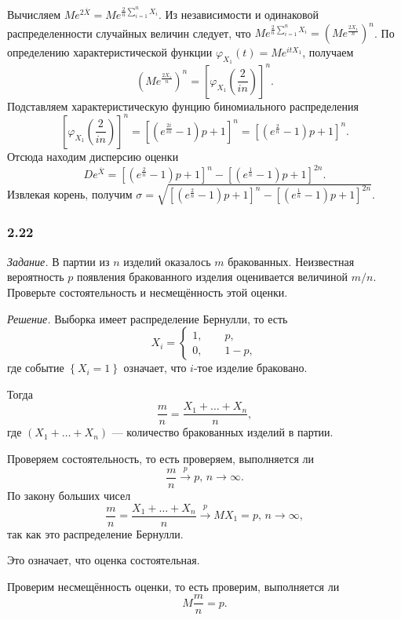 Вычисляем $Me^{2 \overline{X}} = Me^{ \frac{2}{n} \sum \limits_{i = 1}^n X_i}$.
Из независимости и одинаковой распределенности случайных величин следует,
что $Me^{ \frac{2}{n} \sum \limits_{i = 1}^n X_i} = \left( Me^{ \frac{2X_1}{n}} \right)^n$.
По определению характеристической функции $ \varphi_{X_1} \left( t \right) = Me^{itX_1}$, получаем
$$ \left( Me^{ \frac{2X_1}{n}} \right)^n =
  \left[ \varphi_{X_1} \left( \frac{2}{in} \right) \right]^n.$$
Подставляем характеристическую фунцию биномиального распределения
$$ \left[ \varphi_{X_1} \left( \frac{2}{in} \right) \right]^n =
  \left[ \left( e^{ \frac{2i}{in}} - 1 \right) p + 1 \right]^n =
  \left[ \left( e^{ \frac{2}{n}} - 1 \right) p + 1 \right]^n.$$
Отсюда находим дисперсию оценки
$$De^{ \overline{X}} =
  \left[ \left( e^{ \frac{2}{n}} - 1 \right) p + 1 \right]^n -
  \left[ \left( e^{ \frac{1}{n}} - 1 \right) p + 1 \right]^{2n}.$$
Извлекая корень, получим
$ \sigma =
  \sqrt{
    \left[ \left( e^{ \frac{2}{n}} - 1 \right) p + 1 \right]^n -
    \left[ \left( e^{ \frac{1}{n}} - 1 \right) p + 1 \right]^{2n}
  }.$

\subsubsection*{2.22}

\textit{Задание.} В партии из $n$ изделий оказалось $m$ бракованных.
Неизвестная вероятность $p$ появления бракованного изделия оценивается величиной $m / n$.
Проверьте состоятельность и несмещённость этой оценки.

\textit{Решение.} Выборка имеет распределение Бернулли, то есть
$$X_i =
  \begin{cases}
    1, \qquad p, \\
    0, \qquad 1 - p,
  \end{cases}$$
где событие $ \left\{ X_i = 1 \right\} $ означает, что $i$-тое изделие браковано.

Тогда
$$ \frac{m}{n} =
  \frac{X_1 + \dotsc + X_n}{n},$$
где $ \left( X_1 + \dotsc + X_n \right) $ --- количество бракованных изделий в партии.

Проверяем состоятельность, то есть проверяем, выполняется ли
$$ \frac{m}{n} \overset{p}{ \to } p, \,
  n \to \infty.$$
По закону больших чисел
$$ \frac{m}{n} =
  \frac{X_1 + \dotsc + X_n}{n} \overset{p}{ \to }
  MX_1 =
  p, \,
  n \to \infty,$$
так как это распределение Бернулли.

Это означает, что оценка состоятельная.

Проверим несмещённость оценки, то есть проверим, выполняется ли
$$M \frac{m}{n} =
  p.$$

